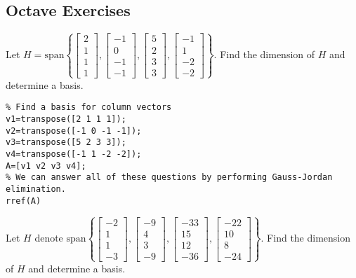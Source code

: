 \documentclass{ximera}
\begin{document}
\subsection*{Octave Exercises}
\begin{problem}\label{prb:5.1} Let $H = \mbox{span}\left\{ \left[
\begin{array}{r}
2 \\
1 \\
1 \\
1
\end{array}
\right] ,\left[
\begin{array}{r}
-1 \\
0 \\
-1 \\
-1
\end{array}
\right] ,\left[
\begin{array}{r}
5 \\
2 \\
3 \\
3
\end{array}
\right] ,\left[
\begin{array}{r}
-1 \\
1 \\
-2 \\
-2
\end{array}
\right] \right\} .$ Find the dimension of $H$ and determine a basis.

\begin{hint}
    \begin{verbatim}
% Find a basis for column vectors
v1=transpose([2 1 1 1]);
v2=transpose([-1 0 -1 -1]);
v3=transpose([5 2 3 3]);
v4=transpose([-1 1 -2 -2]);
A=[v1 v2 v3 v4];
% We can answer all of these questions by performing Gauss-Jordan elimination.
rref(A)
\end{verbatim}
\end{hint}
\end{problem}

\begin{problem}\label{prb:5.3} Let $H$ denote $\mbox{span}\left\{ \left[
\begin{array}{r}
-2 \\
1 \\
1 \\
-3
\end{array}
\right] ,\left[
\begin{array}{r}
-9 \\
4 \\
3 \\
-9
\end{array}
\right] ,\left[
\begin{array}{r}
-33 \\
15 \\
12 \\
-36
\end{array}
\right] ,\left[
\begin{array}{r}
-22 \\
10 \\
8 \\
-24
\end{array}
\right] \right\} .$ Find the dimension of $H$ and determine a basis.

\end{problem}
\end{document}

